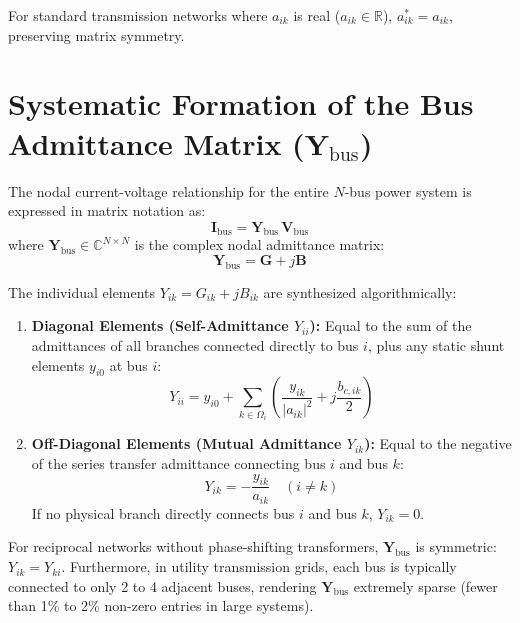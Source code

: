 \documentclass[12pt,a4paper,oneside]{report}
\begin{document}
For standard transmission networks where $a_{ik}$ is real ($a_{ik} \in \mathbb{R}$), $a_{ik}^* = a_{ik}$, preserving matrix symmetry.

\section{Systematic Formation of the Bus Admittance Matrix ($\mathbf{Y}_{\text{bus}}$)}
The nodal current-voltage relationship for the entire $N$-bus power system is expressed in matrix notation as:
\begin{equation}
\mathbf{I}_{\text{bus}} = \mathbf{Y}_{\text{bus}} \, \mathbf{V}_{\text{bus}}
\end{equation}
where $\mathbf{Y}_{\text{bus}} \in \mathbb{C}^{N \times N}$ is the complex nodal admittance matrix:
\begin{equation}
\mathbf{Y}_{\text{bus}} = \mathbf{G} + j \mathbf{B}
\end{equation}

The individual elements $Y_{ik} = G_{ik} + j B_{ik}$ are synthesized algorithmically:
\begin{enumerate}
    \item \textbf{Diagonal Elements (Self-Admittance $Y_{ii}$):} Equal to the sum of the admittances of all branches connected directly to bus $i$, plus any static shunt elements $y_{i0}$ at bus $i$:
    \begin{equation}
    Y_{ii} = y_{i0} + \sum_{k \in \Omega_i} \left( \frac{y_{ik}}{|a_{ik}|^2} + j \frac{b_{c,ik}}{2} \right)
    \label{eq:y_diag}
    \end{equation}
    \item \textbf{Off-Diagonal Elements (Mutual Admittance $Y_{ik}$):} Equal to the negative of the series transfer admittance connecting bus $i$ and bus $k$:
    \begin{equation}
    Y_{ik} = -\frac{y_{ik}}{a_{ik}} \quad (i \neq k)
    \label{eq:y_offdiag}
    \end{equation}
    If no physical branch directly connects bus $i$ and bus $k$, $Y_{ik} = 0$.
\end{enumerate}

For reciprocal networks without phase-shifting transformers, $\mathbf{Y}_{\text{bus}}$ is symmetric: $Y_{ik} = Y_{ki}$. Furthermore, in utility transmission grids, each bus is typically connected to only 2 to 4 adjacent buses, rendering $\mathbf{Y}_{\text{bus}}$ extremely sparse (fewer than 1\% to 2\% non-zero entries in large systems).
\end{document}

